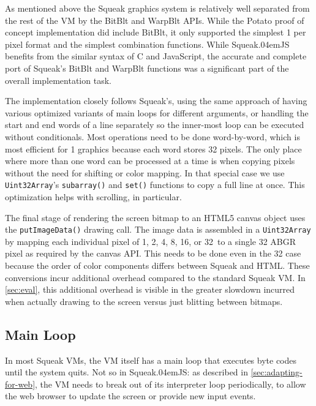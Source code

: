 \documentclass[natbib]{sigplanconf}
\newcommand*\SqueakJS{Squeak\texorpdfstring{\kern.04em}{}JS\xspace}
\newcommand*\JS{JavaScript\xspace}
\begin{document}
As mentioned above the Squeak graphics system is relatively well
separated from the rest of the \acf{VM} by the BitBlt and WarpBlt
\acp{API}. While the Potato proof of concept implementation did include
BitBlt, it only supported the simplest \SI{1}{\bit} per pixel format and the
simplest combination functions. While \SqueakJS benefits from the
similar syntax of C and \JS, the accurate and complete port of
Squeak's BitBlt and WarpBlt functions was a significant part of the
overall implementation task.

The implementation closely follows Squeak's, using the same approach
of having various optimized variants of main loops for different
arguments, or handling the start and end words of a line separately so
the inner-most loop can be executed without conditionals. Most
operations need to be done word-by-word, which is most efficient for
\SI{1}{\bit} graphics because each word stores 32 pixels. The only
place where more than one word can be processed at a time is when
copying pixels without the need for shifting or color mapping. In that
special case we use \lstinline|Uint32Array|'s \lstinline|subarray()|
and \lstinline|set()| functions to copy a full line at once. This
optimization helps with scrolling, in particular.

The final stage of rendering the screen bitmap to an HTML5 canvas
object uses the \lstinline|putImageData()| drawing call. The image
data is assembled in a \lstinline|Uint32Array| by mapping each
individual pixel of 1, 2, 4, 8, 16, or 32\,\si{\bit} to a single
\SI{32}{\bit} ABGR pixel as required by the canvas \ac{API}. This
needs to be done even in the \SI{32}{\bit} case because the order of
color components differs between Squeak and HTML. These conversions
incur additional overhead compared to the standard Squeak \ac{VM}. In
\autoref{sec:eval}, this additional overhead is visible in the greater
slowdown incurred when actually drawing to the screen versus just
blitting between bitmaps.

\subsection{Main Loop}

In most Squeak VMs, the VM itself has a main loop that executes byte
codes until the system quits. Not so in \SqueakJS: as described in
\autoref{sec:adapting-for-web}, the VM needs to break out of
its interpreter loop periodically, to allow the web browser to update
the screen or provide new input events.
\end{document}
